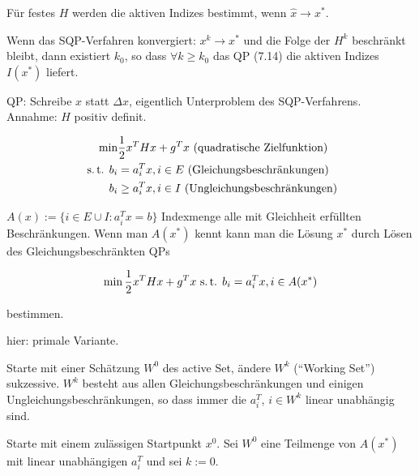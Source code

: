 
\bitm
\item Für festes $H$ werden die aktiven Indizes bestimmt, wenn $\hat x \to x^*$.
\item Wenn das SQP-Verfahren konvergiert: $x^k \to x^*$ und die Folge der $H^k$ beschränkt bleibt, dann existiert $k_0$, so dass $\forall k \geq k_0$ das QP (7.14) die aktiven Indizes $I(x^*)$ liefert.
\eitm


QP: Schreibe $x$ statt $\Delta x$, eigentlich Unterproblem des SQP-Verfahrens. Annahme: $H$ positiv definit.

\begin{align*}
\min &\frac 12 x^T H x + g^T x \text{ (quadratische Zielfunktion)} \\
\text{ s.\,t. } b_i &= a_i^T x, i \in E \text{ (Gleichungsbeschränkungen)} \\
b_i &\geq a_i^T x, i \in I \text{ (Ungleichungsbeschränkungen)} \\
\end{align*}

$A(x) := \{ i \in E \cup I : a_i^T x = b \}$ Indexmenge alle mit Gleichheit erfüllten Beschränkungen. Wenn man $A(x^*)$ kennt kann man die Lösung $x^*$ durch Lösen des Gleichungsbeschränkten QPs

\[ \min \frac 12 x^T H x + g^T x \text{ s.\,t. } b_i = a_i^T x, i \in A(x^*) \]

bestimmen.


hier: primale Variante.

Starte mit einer Schätzung $W^0$ des active Set, ändere $W^k$ ("`Working Set"') sukzessive. $W^k$ besteht aus allen Gleichungsbeschränkungen und einigen Ungleichungsbeschränkungen, so dass immer die $a_i^T$, $i \in W^k$ linear unabhängig sind.


\bitm
\item Starte mit einem zulässigen Startpunkt $x^0$. Sei $W^0$ eine Teilmenge von $A(x^*)$ mit linear unabhängigen $a_i^T$ und sei $k:=0$.

